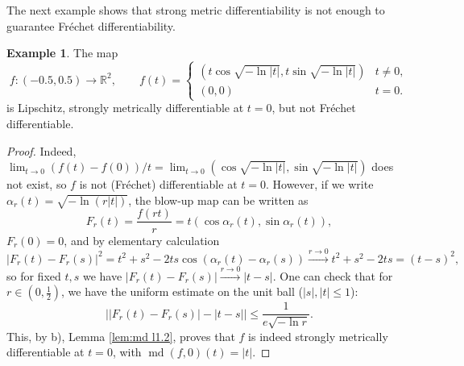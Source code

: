 \documentclass[12pt,leqno]{amsart}
\theoremstyle{definition}
\newtheorem{example}[theorem]{Example}
\newcommand{\bbbr}{\mathbb R}
\def\md{\operatorname{md}}
\numberwithin{theorem}{section} \numberwithin{equation}{section}
\begin{document}
The next example shows that strong metric differentiability is not enough to guarantee Fr\'echet differentiability.
\begin{example}
The map
    $$
f:(-0.5,0.5)\to\bbbr^2,
\qquad
f(t)=\begin{cases}
    \left(t\cos\sqrt{-\ln |t|}, t\sin\sqrt{-\ln |t|}\right)& t\neq 0,\\
    (0,0) &t=0.
\end{cases}
$$
is Lipschitz, strongly metrically differentiable at $t=0$, but not Fr\'echet differentiable.
\end{example}
\begin{proof}
Indeed, $\lim_{t\to 0}(f(t)-f(0))/t=\lim_{t\to 0}(\cos\sqrt{-\ln |t|}, \sin\sqrt{-\ln |t|})$ does not exist, so $f$ is not (Fr\'echet) differentiable at $t=0$. However, if we write $\alpha_r(t)=\sqrt{-\ln(r|t|)}$, the blow-up map can be written as
$$
F_r(t)=\frac{f(rt)}{r}=t(\cos\alpha_r(t),\sin\alpha_r(t)),
$$
$F_r(0)=0$,
and by elementary calculation
$$
|F_r(t)-F_r(s)|^2=t^2+s^2-2ts\cos(\alpha_r(t)-\alpha_r(s))\xrightarrow{r\to 0}t^2+s^2-2ts=(t-s)^2,
$$
so for fixed $t,s$ we have $|F_r(t)-F_r(s)|\xrightarrow{r\to 0}|t-s|$. One can check that for $r\in (0,\frac{1}{2})$, we have the uniform estimate on the unit ball ($|s|,|t|\leq 1$):
$$
\big||F_r(t)-F_r(s)|-|t-s|\big|\leq \frac{1}{e\sqrt{-\ln r}}.
$$
 This, by b), Lemma \ref{lem:md l1.2}, proves that $f$ is indeed strongly metrically differentiable at $t=0$, with ${\md(f,0)(t)=|t|}$.


\end{proof}
\end{document}

